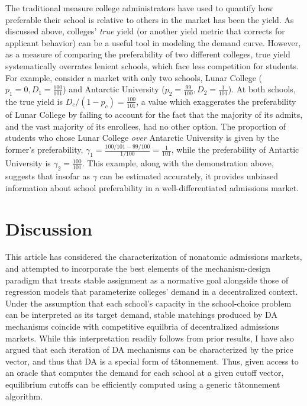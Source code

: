 \documentclass[12pt]{article}
\numberwithin{equation}{subsection}
\theoremstyle{definition}
\begin{document}
The traditional measure college administrators have used to quantify how preferable their school is relative to others in the market has been the yield. As discussed above, colleges' \emph{true} yield (or another yield metric that corrects for applicant behavior) can be a useful tool in modeling the demand curve. However, as a measure of comparing the preferability of two different colleges, true yield systematically overrates lenient schools, which face less competition for students. For example, consider a market with only two schools, Lunar College ($p_1 = 0, D_1 =  \frac{100}{101}$) and Antarctic University ($p_2 = \frac{99}{100}, D_2 = \frac{1}{101}$). At both schools, the true yield is $D_c / (1 - p_c) = \frac{100}{101}$, a value which exaggerates the preferability of Lunar College by failing to account for the fact that the majority of its admits, and the vast majority of its enrollees, had no other option. The proportion of students who chose Lunar College \emph{over} Antarctic University is given by the former's preferability, $\gamma_1 = \frac{100/101 - 99/100}{1/100} = \frac{1}{101}$, while the preferability of Antartic University is $\gamma_2 = \frac{100}{101}$. This example, along with the demonstration above, suggests that insofar as $\gamma$ can be estimated accurately, it provides unbiased information about school preferability in a well-differentiated admissions market.

\section{Discussion}
This article has considered the characterization of nonatomic admissions markets, and attempted to incorporate the best elements of the mechanism-design paradigm that treats stable assignment as a normative goal alongside those of regression models that parameterize colleges' demand in a decentralized context. Under the assumption that each school's capacity in the school-choice problem can be interpreted as its target demand, stable matchings produced by DA mechanisms coincide with competitive equilbria of decentralized admissions markets. While this interpretation readily follows from prior results, I have also argued that each iteration of DA mechanisms can be characterized by the price vector, and thus that DA is a special form of t\^{a}tonnement. Thus, given access to an oracle that computes the demand for each school at a given cutoff vector, equilibrium cutoffs can be efficiently computed using a generic t\^{a}tonnement algorithm.
\end{document}
